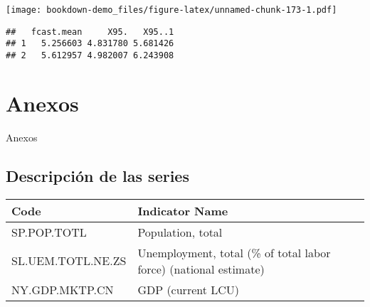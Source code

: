 \documentclass[]{book}
\newenvironment{Shaded}{\begin{snugshade}}{\end{snugshade}}
\newcommand{\KeywordTok}[1]{\textcolor[rgb]{0.13,0.29,0.53}{\textbf{#1}}}
\newcommand{\OperatorTok}[1]{\textcolor[rgb]{0.81,0.36,0.00}{\textbf{#1}}}
\newcommand{\NormalTok}[1]{#1}
\theoremstyle{definition}
\theoremstyle{definition}
\theoremstyle{definition}
\theoremstyle{remark}
\begin{document}
\texttt{[image: bookdown-demo\_files/figure-latex/unnamed-chunk-173-1.pdf]}

\begin{Shaded}
\end{Shaded}

\begin{verbatim}
##   fcast.mean     X95.   X95..1
## 1   5.256603 4.831780 5.681426
## 2   5.612957 4.982007 6.243908
\end{verbatim}

\chapter{Anexos}\label{Anexos}

Anexos

\section{Descripción de las series}\label{descripcion-de-las-series}

\begin{longtable}[]{@{}ll@{}}
\toprule
\begin{minipage}[b]{0.08\columnwidth}\raggedright\strut
Code\strut
\end{minipage} & \begin{minipage}[b]{0.81\columnwidth}\raggedright\strut
Indicator Name\strut
\end{minipage}\tabularnewline
\midrule
\endhead
\begin{minipage}[t]{0.08\columnwidth}\raggedright\strut
SP.POP.TOTL\strut
\end{minipage} & \begin{minipage}[t]{0.81\columnwidth}\raggedright\strut
Population, total\strut
\end{minipage}\tabularnewline
\begin{minipage}[t]{0.08\columnwidth}\raggedright\strut
SL.UEM.TOTL.NE.ZS\strut
\end{minipage} & \begin{minipage}[t]{0.81\columnwidth}\raggedright\strut
Unemployment, total (\% of total labor force) (national estimate)\strut
\end{minipage}\tabularnewline
\begin{minipage}[t]{0.08\columnwidth}\raggedright\strut
NY.GDP.MKTP.CN\strut
\end{minipage} & \begin{minipage}[t]{0.81\columnwidth}\raggedright\strut
GDP (current LCU)\strut
\end{minipage}\tabularnewline
\bottomrule
\end{longtable}
\end{document}
